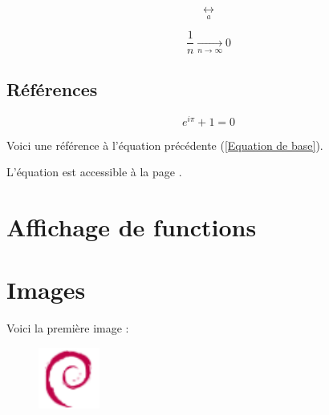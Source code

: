\documentclass[a4paper]{article}
\begin{document}
\begin{equation}
\underset{a}{\longleftrightarrow}
\end{equation}


\begin{equation}
\frac{1}{n} \xrightarrow[n \rightarrow \infty]{} 0
\end{equation}

\subsection{Références}

\begin{equation}\label{Equation de base}
e^{i\pi}+1=0
\end{equation}

Voici une référence à l'équation précédente (\ref{Equation de base}).

L'équation est accessible à la page \pageref{Equation de base}.

\section{Affichage de functions}


\section{Images}

Voici la première image :
\begin{figure}[h] %
\begin{center}
\includegraphics[height=2cm]{debian-logo}
\end{center}
\end{figure}
\end{document}
